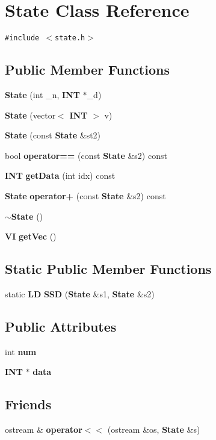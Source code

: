 \section{State Class Reference}
\label{classState}
{\tt \#include $<$state.h$>$}

\subsection*{Public Member Functions}
\begin{CompactItemize}
\item 
{\bf State} (int \_\-n, {\bf INT} $\ast$\_\-d)
\item 
{\bf State} (vector$<$ {\bf INT} $>$ v)
\item 
{\bf State} (const {\bf State} \&st2)
\item 
bool {\bf operator==} (const {\bf State} \&s2) const 
\item 
{\bf INT} {\bf getData} (int idx) const
\item 
{\bf State} {\bf operator+} (const {\bf State} \&s2) const 
\item 
{\bf $\sim$State} ()
\item 
{\bf VI} {\bf getVec} ()
\end{CompactItemize}
\subsection*{Static Public Member Functions}
\begin{CompactItemize}
\item 
static {\bf LD} {\bf SSD} ({\bf State} \&s1, {\bf State} \&s2)
\end{CompactItemize}
\subsection*{Public Attributes}
\begin{CompactItemize}
\item 
int {\bf num}
\item 
{\bf INT} $\ast$ {\bf data}
\end{CompactItemize}
\subsection*{Friends}
\begin{CompactItemize}
\item 
ostream \& {\bf operator$<$$<$} (ostream \&os, {\bf State} \&s)
\end{CompactItemize}



